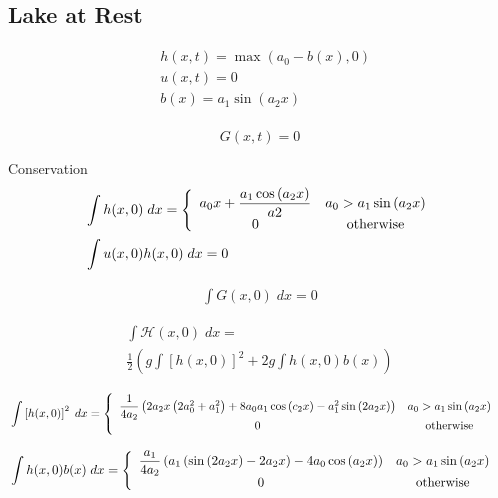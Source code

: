 \subsection{Lake at Rest}

\begin{subequations}
	\begin{align}
	&h(x,t) =  \max\left(a_0 - b(x),0\right)\\
	&u(x,t) = 0 \\
	&b(x) = a_1 \sin\left(a_2 x\right) \\
	\end{align}
\end{subequations}

\begin{equation}
G(x,t) =0 
\end{equation}

Conservation
\begin{align}
&\int h(x,0) \; dx = \left\lbrace  \begin{array}{c c}
a_0 x + \dfrac{a_1 \cos\left(a_2 x\right)}{a2} & a_0 > a_1 \sin\left(a_2 x\right)
\\ 0 & \text{otherwise}
\end{array}\right. \\
&\int u(x,0)h(x,0) \; dx =0
\end{align}

\begin{multline}
\int G(x,0) \; dx = 0
\end{multline}

\begin{multline}
\int \mathcal{H}(x,0) \; dx =  \\\frac{1}{2} \left(g\int\left[h(x,0)\right]^2  + 2g\int h(x,0)b(x) \right)
\end{multline}


\begin{align}
&\int \left[h(x,0)\right]^2 \; dx = \left\lbrace  \begin{array}{c c}
\dfrac{1}{4a_2} \left(2a_2 x\left(2a_0^2 + a_1^2\right) + 8 a_0 a_1 \cos\left(c_2 x\right)- a_1^2\sin\left(2a_2 x\right)\right) & a_0 > a_1 \sin\left(a_2 x\right)
\\ 0 & \text{otherwise}
\end{array}\right. 
\end{align}

\begin{align}
&\int h(x,0)b(x)\; dx = \left\lbrace  \begin{array}{c c}
\dfrac{a_1}{4a_2}\left(a_1\left(\sin\left(2a_2x\right) - 2 a_2 x\right) - 4 a_0 \cos\left(a_2 x\right)\right)  & a_0 > a_1 \sin\left(a_2 x\right)
\\ 0 & \text{otherwise}
\end{array}\right. 
\end{align}

